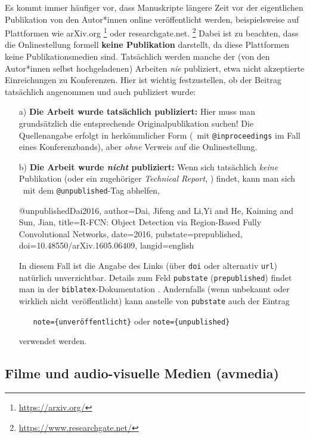 Es kommt immer häufiger vor, dass Manuskripte längere Zeit vor der eigentlichen Pub\-likation von den Autor*innen
online veröffentlicht werden, beispielsweise auf Plattformen wie \textsf{arXiv.org}%
\footnote{\url{https://arxiv.org/}}
oder \textsf{researchgate.net}.%
\footnote{\url{https://www.researchgate.net/}}
Dabei ist zu beachten, dass die Onlinestellung formell \textbf{keine Publikation} darstellt, da diese Plattformen
keine Publikationsmedien sind. Tatsächlich werden manche der (von den Autor*innen selbst hochgeladenen) Arbeiten
\emph{nie} publiziert, etwa nicht akzeptierte Einreichungen zu Konferenzen. Hier ist wichtig festzustellen, ob der
Beitrag tatsächlich angenommen und auch publiziert wurde:
%
\begin{itemize}
\item[a)]
\textbf{Die Arbeit wurde tatsächlich publiziert:} Hier muss man grundsätzlich die entsprechende Original\-publikation
suchen! Die Quellenangabe erfolgt in herkömmlicher Form (\zB\ mit \texttt{@inproceedings} im Fall eines
Konferenzbands), aber \emph{ohne} Verweis auf die Onlinestellung.
\item[b)]
\textbf{Die Arbeit wurde \emph{nicht} publiziert:} Wenn sich tatsächlich \emph{keine} Publikation (oder ein
zugehöriger \emph{Technical Report}, \so) findet,  kann man sich \evtl\ mit dem \texttt{@unpublished}-Tag abhelfen,
\zB\ \cite{Dai2016}
\begin{GenericCode}[numbers=none]
@unpublished{Dai2016,
  author={Dai, Jifeng and Li,Yi and He, Kaiming and Sun, Jian},
  title={{R-FCN:} Object Detection via Region-Based Fully Convolutional Networks},
  date={2016},
  pubstate={prepublished},
  doi={10.48550/arXiv.1605.06409},
  langid={english}
}
\end{GenericCode}
In diesem Fall ist die Angabe des Links (über \texttt{doi} oder alternativ \texttt{url}) natürlich unverzichtbar.
Details zum Feld \texttt{pubstate} (\texttt{prepublished}) findet man in der \texttt{biblatex}-Dokumentation
\cite[Abschn.\ 4.9.2.11]{Kime2020}. Andernfalls (wenn unbekannt oder wirklich nicht veröffentlicht) kann anstelle von
\texttt{pubstate} auch der Eintrag
\begin{itemize}
\item[]\texttt{note=\{unveröffentlicht\}} \quad oder \quad \texttt{note=\{unpublished\}} 
\end{itemize}
verwendet werden.
\end{itemize}



\subsection{Filme und audio-visuelle Medien (\textsf{avmedia})}
\label{sec:KategorieAvmedia}

